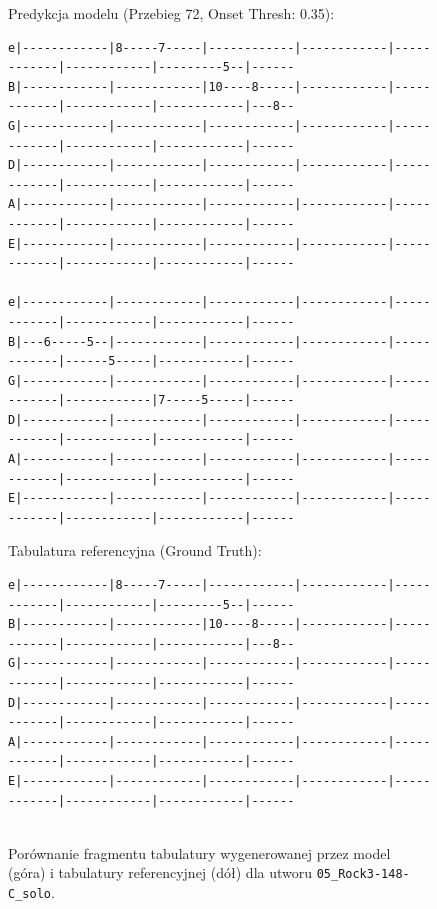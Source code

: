 \begin{figure}[H]
    \centering
    \caption{Porównanie fragmentu tabulatury wygenerowanej przez model (góra) i tabulatury referencyjnej (dół) dla utworu \texttt{05\_Rock3-148-C\_solo}.}
    \label{fig:tab_high_quality_solo}
    \vspace{5pt}
    
    \centerline{\textsf{Predykcja modelu (Przebieg 72, Onset Thresh: 0.35):}}
    {\scriptsize
\begin{verbatim}
e|------------|8-----7-----|------------|------------|------------|------------|---------5--|------
B|------------|------------|10----8-----|------------|------------|------------|------------|---8--
G|------------|------------|------------|------------|------------|------------|------------|------
D|------------|------------|------------|------------|------------|------------|------------|------
A|------------|------------|------------|------------|------------|------------|------------|------
E|------------|------------|------------|------------|------------|------------|------------|------

e|------------|------------|------------|------------|------------|------------|------------|------
B|---6-----5--|------------|------------|------------|------------|------5-----|------------|------
G|------------|------------|------------|------------|------------|------------|7-----5-----|------
D|------------|------------|------------|------------|------------|------------|------------|------
A|------------|------------|------------|------------|------------|------------|------------|------
E|------------|------------|------------|------------|------------|------------|------------|------
\end{verbatim}
    }
    \vspace{5pt}
    \centerline{\textsf{Tabulatura referencyjna (Ground Truth):}}
    {\scriptsize 
\begin{verbatim}
e|------------|8-----7-----|------------|------------|------------|------------|---------5--|------
B|------------|------------|10----8-----|------------|------------|------------|------------|---8--
G|------------|------------|------------|------------|------------|------------|------------|------
D|------------|------------|------------|------------|------------|------------|------------|------
A|------------|------------|------------|------------|------------|------------|------------|------
E|------------|------------|------------|------------|------------|------------|------------|------


\end{verbatim}}
\end{figure}
